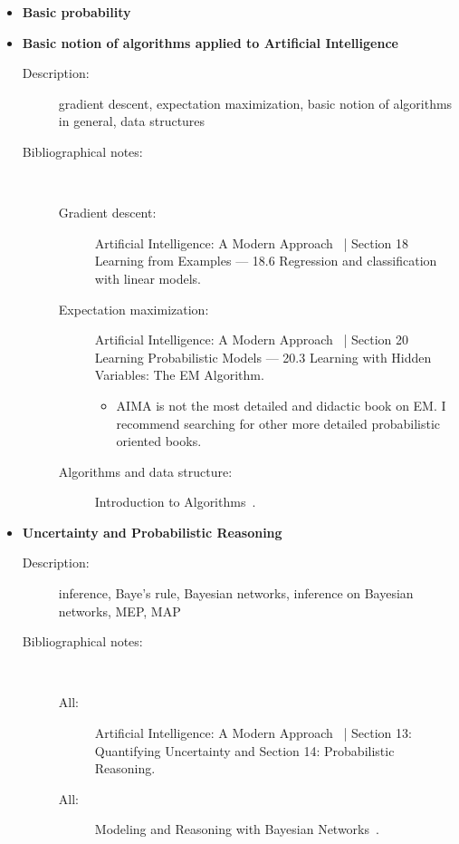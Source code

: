\documentclass[a4paper,10pt]{article}
\theoremstyle{plain}
\begin{document}
\begin{appendices}
\begin{itemize}
  \item \textbf{Basic probability}
  \item \textbf{Basic notion of algorithms applied to Artificial Intelligence}
    \begin{description}
      \item[Description:] gradient descent, expectation maximization, basic notion of algorithms in
        general, data structures
      \item[Bibliographical notes:]\ \
        \begin{description}
          \item[Gradient descent:] Artificial Intelligence: A Modern Approach~\cite{aima} | Section
            18 Learning from Examples --- 18.6 Regression and classification with linear models.
          \item[Expectation maximization:] Artificial Intelligence: A Modern Approach~\cite{aima} |
            Section 20 Learning Probabilistic Models --- 20.3 Learning with Hidden Variables: The
            EM Algorithm.
            \begin{itemize}
              \item AIMA is not the most detailed and didactic book on EM\@. I recommend searching
                for other more detailed probabilistic oriented books.
            \end{itemize}
          \item[Algorithms and data structure:] Introduction to Algorithms~\cite{algorithms}.
        \end{description}
    \end{description}
  \item \textbf{Uncertainty and Probabilistic Reasoning}
    \begin{description}
      \item[Description:] inference, Baye's rule, Bayesian networks, inference on Bayesian
        networks, MEP, MAP
      \item[Bibliographical notes:]\ \
        \begin{description}
          \item[All:] Artificial Intelligence: A Modern Approach~\cite{aima} | Section 13:
            Quantifying Uncertainty and Section 14: Probabilistic Reasoning.
          \item[All:] Modeling and Reasoning with Bayesian Networks~\cite{bayes-net-darwiche}.
        \end{description}

\end{description}
\end{itemize}
\end{appendices}
\end{document}

